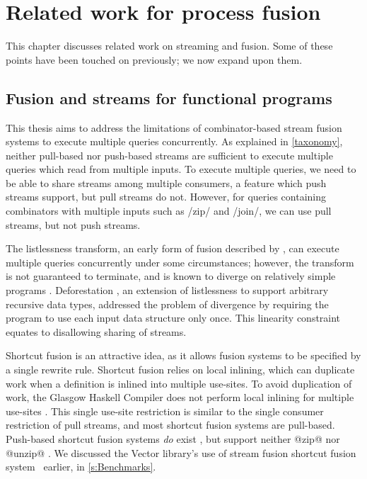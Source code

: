 \chapter{Related work for process fusion}
\label{related}

This chapter discusses related work on streaming and fusion.
Some of these points have been touched on previously; we now expand upon them.

\section{Fusion and streams for functional programs}
\label{related/fusion}
\label{related/stream-fusion}

This thesis aims to address the limitations of combinator-based stream fusion systems to execute multiple queries concurrently.
As explained in \cref{taxonomy}, neither pull-based nor push-based streams are sufficient to execute multiple queries which read from multiple inputs.
To execute multiple queries, we need to be able to share streams among multiple consumers, a feature which push streams support, but pull streams do not.
However, for queries containing combinators with multiple inputs such as \Hs/zip/ and \Hs/join/, we can use pull streams, but not push streams.

The listlessness transform, an early form of fusion described by \citet{wadler1984listlessness}, can execute multiple queries concurrently under some circumstances; however, the transform is not guaranteed to terminate, and is known to diverge on relatively simple programs \citep{caspi1996synchronous}.
Deforestation \citep{wadler1990deforestation}, an extension of listlessness to support arbitrary recursive data types, addressed the problem of divergence by requiring the program to use each input data structure only once.
This linearity constraint equates to disallowing sharing of streams.

Shortcut fusion is an attractive idea, as it allows fusion systems to be specified by a single rewrite rule.
Shortcut fusion relies on local inlining, which can duplicate work when a definition is inlined into multiple use-sites.
To avoid duplication of work, the Glasgow Haskell Compiler does not perform local inlining for multiple use-sites \citep{jones1998transformation}.
This single use-site restriction is similar to the single consumer restriction of pull streams, and most shortcut fusion systems are pull-based.
Push-based shortcut fusion systems \emph{do} exist \cite{gill1993short}, but support neither @zip@ nor @unzip@ \cite{svenningsson2002shortcut,lippmeier2013data}.
We discussed the Vector library's use of stream fusion shortcut fusion system~\cite{coutts2007stream} earlier, in \cref{s:Benchmarks}.

